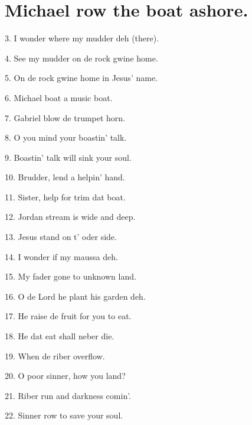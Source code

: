 \documentclass[a5paper,10pt]{book}
\begin{document}
\newpage
\section{Michael row the boat ashore.}
\thispagestyle{empty}

\begin{song}
\end{song}

\begin{stanza}
\setlength{\itemsep}{1pt}
\setlength{\parskip}{0pt}
\item[3.]
  I wonder where my mudder deh (there).

\item[4.]
  See my mudder on de rock gwine home.

\item[5.]
  On de rock gwine home in Jesus' name.

\item[6.]
  Michael boat a music boat.

\item[7.]
  Gabriel blow de trumpet horn.

\item[8.]
  O you mind your boastin' talk.

\item[9.]
  Boastin' talk will sink your soul.

\item[10.]
  Brudder, lend a helpin' hand.

\item[11.]
  Sister, help for trim dat boat.

\item[12.]
  Jordan stream is wide and deep.

\item[13.]
  Jesus stand on t' oder side.

\item[14.]
  I wonder if my maussa deh.

\item[15.]
  My fader gone to unknown land.

\item[16.]
  O de Lord he plant his garden deh.

\item[17.]
  He raise de fruit for you to eat.

\item[18.]
  He dat eat shall neber die.

\item[19.]
  When de riber overflow.

\item[20.]
  O poor sinner, how you land?

\item[21.]
  Riber run and darkness comin'.

\item[22.]
  Sinner row to save your soul.
\end{stanza}
\end{document}
